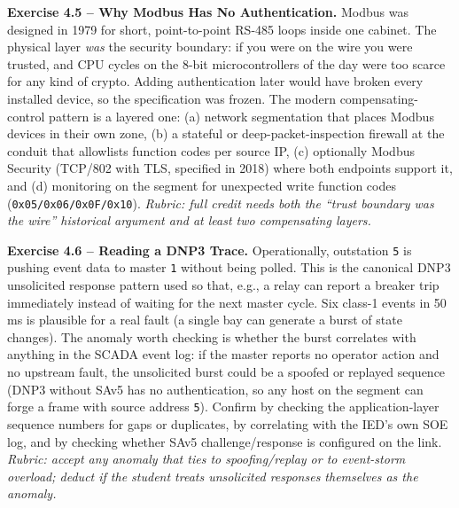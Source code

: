 \documentclass[11pt,a4paper]{article}
\begin{document}
\begin{solutionbox}
\textbf{Exercise 4.5 -- Why Modbus Has No Authentication.}
Modbus was designed in 1979 for short, point-to-point RS-485 loops inside
one cabinet. The physical layer \emph{was} the security boundary: if you
were on the wire you were trusted, and CPU cycles on the 8-bit
microcontrollers of the day were too scarce for any kind of crypto. Adding
authentication later would have broken every installed device, so the
specification was frozen.
The modern compensating-control pattern is a layered one: (a) network
segmentation that places Modbus devices in their own zone, (b) a stateful or
deep-packet-inspection firewall at the conduit that allowlists function
codes per source IP, (c) optionally Modbus Security (TCP/802 with TLS,
specified in 2018) where both endpoints support it, and (d) monitoring on
the segment for unexpected write function codes
(\texttt{0x05/0x06/0x0F/0x10}).
\textit{Rubric: full credit needs both the ``trust boundary was the wire''
historical argument and at least two compensating layers.}
\end{solutionbox}

\begin{solutionbox}
\textbf{Exercise 4.6 -- Reading a DNP3 Trace.}
Operationally, outstation \texttt{5} is pushing event data to master
\texttt{1} without being polled. This is the canonical DNP3 unsolicited
response pattern used so that, e.g., a relay can report a breaker trip
immediately instead of waiting for the next master cycle. Six class-1 events
in 50\,ms is plausible for a real fault (a single bay can generate a burst
of state changes).
The anomaly worth checking is whether the burst correlates with anything in
the SCADA event log: if the master reports no operator action and no
upstream fault, the unsolicited burst could be a spoofed or replayed
sequence (DNP3 without SAv5 has no authentication, so any host on the
segment can forge a frame with source address \texttt{5}). Confirm by
checking the application-layer sequence numbers for gaps or duplicates, by
correlating with the IED's own SOE log, and by checking whether SAv5
challenge/response is configured on the link.
\textit{Rubric: accept any anomaly that ties to spoofing/replay or to
event-storm overload; deduct if the student treats unsolicited responses
themselves as the anomaly.}
\end{solutionbox}
\end{document}
